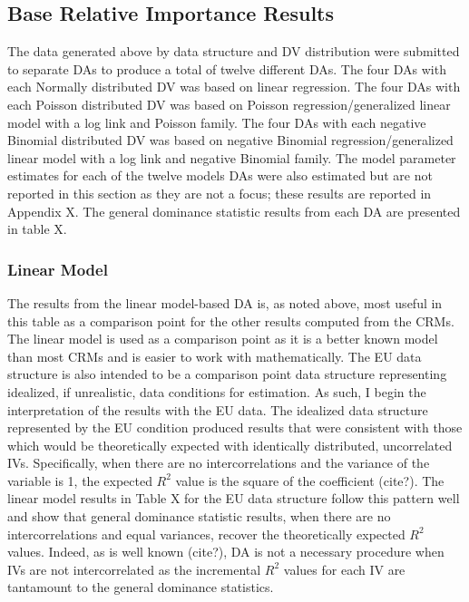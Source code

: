 \documentclass[ShortAfour,times,sageapa]{sagej}
\begin{document}
	\subsection{Base Relative Importance Results}
	
	The data generated above by data structure and DV distribution were submitted to separate DAs to produce a total of twelve different DAs.
	The four DAs with each Normally distributed DV was based on linear regression.
	The four DAs with each Poisson distributed DV was based on Poisson regression/generalized linear model with a log link and Poisson family.
	The four DAs with each negative Binomial distributed DV was based on negative Binomial regression/generalized linear model with a log link and negative Binomial family.
	The model parameter estimates for each of the twelve models DAs were also estimated but are not reported in this section as they are not a focus; these results are reported in Appendix X. 
	The general dominance statistic results from each DA are presented in table X.
	
	
	
		\subsubsection{Linear Model}
	
	The results from the linear model-based DA is, as noted above, most useful in this table as a comparison point for the other results computed from the CRMs.
	The linear model is used as a comparison point as it is a better known model than most CRMs and is easier to work with mathematically.
	The EU data structure is also intended to be a comparison point data structure representing idealized, if unrealistic, data conditions for estimation.
	As such, I begin the interpretation of the results with the EU data.	
	The idealized data structure represented by the EU condition produced results that were consistent with those which would be theoretically expected with identically distributed, uncorrelated IVs.  
	Specifically, when there are no intercorrelations and the variance of the variable is 1, the expected $R^2$ value is the square of the coefficient (cite?).
	The linear model results in Table X for the EU data structure follow this pattern well and show that general dominance statistic results, when there are no intercorrelations and equal variances, recover the theoretically expected $R^2$ values.  
	Indeed, as is well known (cite?), DA is not a necessary procedure when IVs are not intercorrelated as the incremental $R^2$ values for each IV are tantamount to the general dominance statistics.
	
\end{document}
